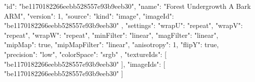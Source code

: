 {
  "id": "be1170182266eebb528557e93b9eeb30",
  "name": "Forest Undergrowth A Bark ARM",
  "version": 1,
  "source": {
    "kind": "image",
    "imageId": "be1170182266eebb528557e93b9eeb30"
  },
  "settings": {
    "wrapU": "repeat",
    "wrapV": "repeat",
    "wrapW": "repeat",
    "minFilter": "linear",
    "magFilter": "linear",
    "mipMap": true,
    "mipMapFilter": "linear",
    "anisotropy": 1,
    "flipY": true,
    "precision": "low",
    "colorSpace": "srgb"
  },
  "textureIds": [
    "be1170182266eebb528557e93b9eeb30"
  ],
  "imageIds": [
    "be1170182266eebb528557e93b9eeb30"
  ]
}
